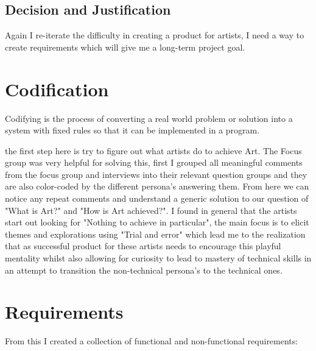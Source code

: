 \documentclass[a4paper]{report}
\begin{document}
\subsection{Decision and Justification}
Again I re-iterate the difficulty in creating a product for artists, I need a way to create requirements which will give me a long-term project goal.
\section{Codification}
Codifying is the process of converting a real world problem or solution into a system with fixed rules so that it can be implemented in a program. 

the first step here is try to figure out what artists do to achieve Art. The Focus group was very helpful for solving this, first I grouped all meaningful comments from the focus group and interviews into their relevant question groups and they are also color-coded by the different persona's answering them. From here we can notice any repeat comments and understand a generic solution to our question of "What is Art?" and "How is Art achieved?". I found in general that the artists start out looking for "Nothing to achieve in particular", the main focus is to elicit themes and explorations using "Trial and error" which lead me to the realization that as successful product for these artists needs to encourage this playful mentality whilst also allowing for curiosity to lead to mastery of technical skills in an attempt to transition the non-technical persona's to the technical ones. 

\section{Requirements}
From this I created a collection of functional and non-functional requirements:
\end{document}
